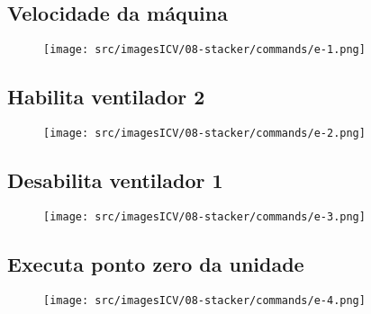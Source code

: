 \thispagestyle{fancy}
\vspace*{40 pt}
\subsection{\small Velocidade da máquina}
\vspace*{\fill}
\begin{figure}[h]
    \centering
    \texttt{[image: src/imagesICV/08-stacker/commands/e-1.png]}
\end{figure}
\vspace*{\fill}

\newpage
\thispagestyle{fancy}
\vspace*{40 pt}
\subsection{\small Habilita ventilador 2}
\vspace*{\fill}
\begin{figure}[h]
    \centering
    \texttt{[image: src/imagesICV/08-stacker/commands/e-2.png]}
\end{figure}
\vspace*{\fill}

\newpage
\thispagestyle{fancy}
\vspace*{40 pt}
\subsection{\small Desabilita ventilador 1}
\vspace*{\fill}
\begin{figure}[h]
    \centering
    \texttt{[image: src/imagesICV/08-stacker/commands/e-3.png]}
\end{figure}
\vspace*{\fill}

\newpage
\thispagestyle{fancy}
\vspace*{40 pt}
\subsection{\small Executa ponto zero da unidade}
\vspace*{\fill}
\begin{figure}[h]
    \centering
    \texttt{[image: src/imagesICV/08-stacker/commands/e-4.png]}
\end{figure}
\vspace*{\fill}


